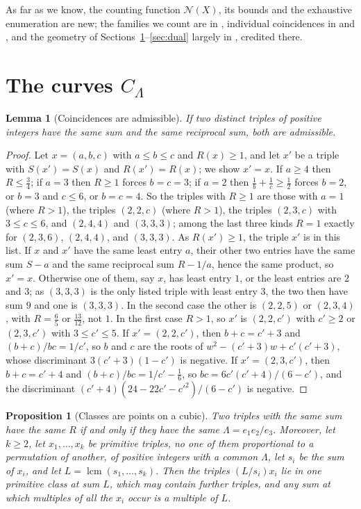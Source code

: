 \documentclass[11pt]{amsart}
\newtheorem{proposition}[theorem]{Proposition}
\newtheorem{lemma}[theorem]{Lemma}
\theoremstyle{definition}
\theoremstyle{remark}
\newcommand{\N}{\mathcal{N}}
\begin{document}
As far as we know, the counting function $\N(X)$, its bounds and the exhaustive enumeration are new; the families we count are in \cite{choudhry2011}, individual coincidences in \cite[(3)]{choudhry2011} and \cite{chen2025}, and the geometry of Sections~\ref{sec:curves}--\ref{sec:dual} largely in \cite{bgn1993,beauville1982,kubert1976}, credited there.

\section{The curves \texorpdfstring{$C_\Lambda$}{C\_Lambda}}\label{sec:curves}

\begin{lemma}[Coincidences are admissible]\label{lem:admissible}
If two distinct triples of positive integers have the same sum and the same reciprocal sum, both are admissible.
\end{lemma}

\begin{proof}
Let $x=(a,b,c)$ with $a\le b\le c$ and $R(x)\ge1$, and let $x'$ be a triple with $S(x')=S(x)$ and $R(x')=R(x)$; we show $x'=x$. If $a\ge4$ then $R\le\frac34$; if $a=3$ then $R\ge1$ forces $b=c=3$; if $a=2$ then $\frac1b+\frac1c\ge\frac12$ forces $b=2$, or $b=3$ and $c\le6$, or $b=c=4$. So the triples with $R\ge1$ are those with $a=1$ (where $R>1$), the triples $(2,2,c)$ (where $R>1$), the triples $(2,3,c)$ with $3\le c\le6$, and $(2,4,4)$ and $(3,3,3)$; among the last three kinds $R=1$ exactly for $(2,3,6)$, $(2,4,4)$, and $(3,3,3)$. As $R(x')\ge1$, the triple $x'$ is in this list. If $x$ and $x'$ have the same least entry $a$, their other two entries have the same sum $S-a$ and the same reciprocal sum $R-1/a$, hence the same product, so $x'=x$. Otherwise one of them, say $x$, has least entry $1$, or the least entries are $2$ and $3$; as $(3,3,3)$ is the only listed triple with least entry $3$, the two then have sum $9$ and one is $(3,3,3)$. In the second case the other is $(2,2,5)$ or $(2,3,4)$, with $R=\frac65$ or $\frac{13}{12}$, not $1$. In the first case $R>1$, so $x'$ is $(2,2,c')$ with $c'\ge2$ or $(2,3,c')$ with $3\le c'\le5$. If $x'=(2,2,c')$, then $b+c=c'+3$ and $(b+c)/bc=1/c'$, so $b$ and $c$ are the roots of $w^2-(c'+3)w+c'(c'+3)$, whose discriminant $3(c'+3)(1-c')$ is negative. If $x'=(2,3,c')$, then $b+c=c'+4$ and $(b+c)/bc=1/c'-\frac16$, so $bc=6c'(c'+4)/(6-c')$, and the discriminant $(c'+4)(24-22c'-c'^2)/(6-c')$ is negative.
\end{proof}

\begin{proposition}[Classes are points on a cubic]\label{prop:reformulation}
Two triples with the same sum have the same $R$ if and only if they have the same $\Lambda=e_1e_2/e_3$. Moreover, let $k\ge2$, let $x_1,\dots,x_k$ be primitive triples, no one of them proportional to a permutation of another, of positive integers with a common $\Lambda$, let $s_i$ be the sum of $x_i$, and let $L=\operatorname{lcm}(s_1,\dots,s_k)$. Then the triples $(L/s_i)x_i$ lie in one primitive class at sum $L$, which may contain further triples, and any sum at which multiples of all the $x_i$ occur is a multiple of $L$.
\end{proposition}
\end{document}
